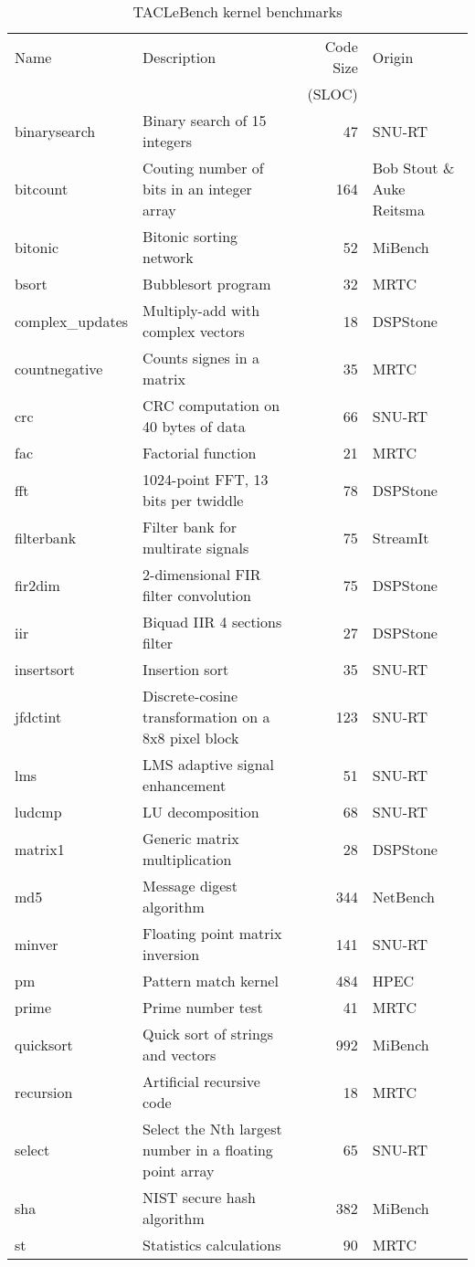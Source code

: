\documentclass[a4paper,UKenglish]{oasics}
\begin{document}
\begin{table}[t!]
\centering
\caption{\label{tab:bench_kernel}TACLeBench kernel benchmarks}
\begin{tabular}{lL{5.5cm}rR{2.5cm}}
\toprule
Name & Description & Code Size & Origin\\
     &             &     (SLOC) & \\ \midrule
binarysearch & Binary search of 15 integers & 47 & SNU-RT \\
bitcount & Couting number of bits in an integer array & 164  & Bob Stout \& Auke Reitsma\\
bitonic &  Bitonic sorting network  & 52 & MiBench \\
bsort & Bubblesort program & 32 & MRTC \\
complex\_updates &  Multiply-add with complex vectors & 18 & DSPStone \\
countnegative &  Counts signes in a matrix  & 35 & MRTC \\
crc &  CRC computation on 40 bytes of data  & 66 & SNU-RT \\
fac &  Factorial function & 21 & MRTC \\
fft &  1024-point FFT, 13 bits per twiddle  & 78  & DSPStone \\
filterbank & Filter bank for multirate signals  & 75 & StreamIt \\
fir2dim &  2-dimensional FIR filter convolution & 75 & DSPStone \\
iir &  Biquad IIR 4 sections filter & 27 & DSPStone \\
insertsort & Insertion sort & 35 & SNU-RT \\
jfdctint & Discrete-cosine transformation on a 8x8 pixel block  & 123  & SNU-RT \\
lms &  LMS adaptive signal enhancement  & 51  & SNU-RT \\
ludcmp & LU decomposition & 68 & SNU-RT \\
matrix1 &  Generic matrix multiplication  & 28 & DSPStone \\
md5 &  Message digest algorithm & 344  & NetBench \\
minver & Floating point matrix inversion  & 141  & SNU-RT \\
pm & Pattern match kernel & 484  & HPEC \\
prime &  Prime number test  & 41 & MRTC \\
quicksort &  Quick sort of strings and  vectors & 992 & MiBench \\
recursion &  Artificial recursive code  & 18 & MRTC \\
select & Select the Nth largest number in a floating point array  & 65 & SNU-RT \\
sha &  NIST secure hash algorithm & 382  & MiBench \\
st & Statistics calculations & 90  & MRTC \\
\bottomrule
\end{tabular}
\end{table}
\end{document}
